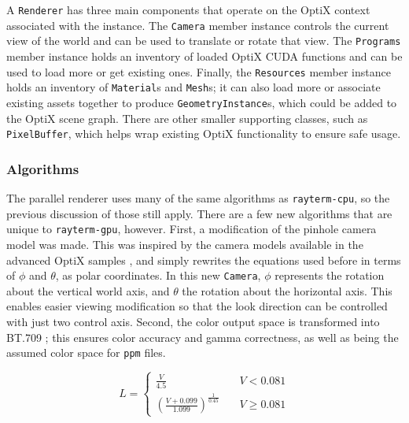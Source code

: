 A \texttt{Renderer} has three main components that operate on the OptiX context associated with the instance.
The \texttt{Camera} member instance controls the current view of the world and can be used to translate or rotate that view.
The \texttt{Programs} member instance holds an inventory of loaded OptiX CUDA functions and can be used to load more or get existing ones.
Finally, the \texttt{Resources} member instance holds an inventory of \texttt{Material}s and \texttt{Mesh}s; it can also load more or associate existing assets together to produce \texttt{GeometryInstance}s, which could be added to the OptiX scene graph.
There are other smaller supporting classes, such as \texttt{PixelBuffer}, which helps wrap existing OptiX functionality to ensure safe usage.

\subsubsection{Algorithms} \label{ch:methods:renderer:parallel:algorithms}

The parallel renderer uses many of the same algorithms as \texttt{rayterm-cpu}, so the previous discussion of those still apply.
There are a few new algorithms that are unique to \texttt{rayterm-gpu}, however.
First, a modification of the pinhole camera model was made.
This was inspired by the camera models available in the advanced OptiX samples \cite{optixsamples}, and simply rewrites the equations used before in terms of $\phi$ and $\theta$, as polar coordinates.
In this new \texttt{Camera}, $\phi$ represents the rotation about the vertical world axis, and $\theta$ the rotation about the horizontal axis.
This enables easier viewing modification so that the look direction can be controlled with just two control axis.
Second, the color output space is transformed into BT.709 \cite{ituBT709}; this ensures color accuracy and gamma correctness, as well as being the assumed color space for \texttt{ppm} files.


\begin{equation}
\label{equation:bt709}
  L = \left\{
              \begin{array}{ll}
                \frac{V}{4.5} & \quad V < 0.081 \\
                (\frac{V + 0.099}{1.099})^\frac{1}{0.45} & \quad V \geq 0.081
              \end{array}
    \right.
\end{equation}

